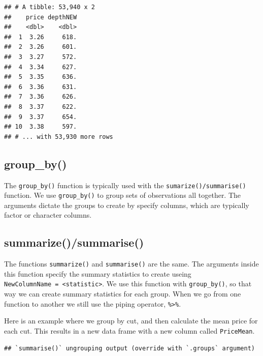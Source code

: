 \documentclass[
]{book}
\newenvironment{Shaded}{\begin{snugshade}}{\end{snugshade}}
\newcommand{\DataTypeTok}[1]{\textcolor[rgb]{0.13,0.29,0.53}{#1}}
\newcommand{\KeywordTok}[1]{\textcolor[rgb]{0.13,0.29,0.53}{\textbf{#1}}}
\newcommand{\NormalTok}[1]{#1}
\newcommand{\OperatorTok}[1]{\textcolor[rgb]{0.81,0.36,0.00}{\textbf{#1}}}
\newcommand{\StringTok}[1]{\textcolor[rgb]{0.31,0.60,0.02}{#1}}
\begin{document}
\begin{verbatim}
## # A tibble: 53,940 x 2
##    price depthNEW
##    <dbl>    <dbl>
##  1  3.26     618.
##  2  3.26     601.
##  3  3.27     572.
##  4  3.34     627.
##  5  3.35     636.
##  6  3.36     631.
##  7  3.36     626.
##  8  3.37     622.
##  9  3.37     654.
## 10  3.38     597.
## # ... with 53,930 more rows
\end{verbatim}

\hypertarget{group_by}{%
\subsection{group\_by()}\label{group_by}}

The \texttt{group\_by()} function is typically used with the \texttt{sumarize()/summarise()} function. We use \texttt{group\_by()} to group sets of observations all together. The arguments dictate the groups to create by specify columns, which are typically factor or character columns.

\hypertarget{summarizesummarise}{%
\subsection{summarize()/summarise()}\label{summarizesummarise}}

The functions \texttt{summarize()} and \texttt{summarise()} are the same. The arguments inside this function specify the summary statistics to create useing \texttt{NewColumnName\ =\ \textless{}statistic\textgreater{}}. We use this function with \texttt{group\_by()}, so that way we can create summary statistics for each group. When we go from one function to another we still use the piping operator, \texttt{\%\textgreater{}\%}.

Here is an example where we group by cut, and then calculate the mean price for each cut. This results in a new data frame with a new column called \texttt{PriceMean}.

\begin{Shaded}
\end{Shaded}

\begin{verbatim}
## `summarise()` ungrouping output (override with `.groups` argument)
\end{verbatim}
\end{document}
